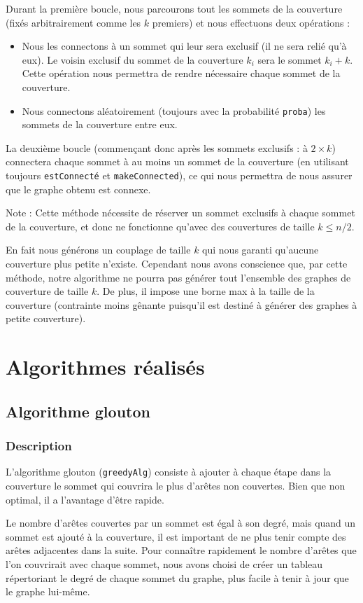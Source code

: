 \documentclass[a4paper,10pt]{article}
\newcommand*{\itemb}{\item[$\bullet$]}
\begin{document}
Durant la première boucle, nous parcourons tout les sommets de la couverture (fixés arbitrairement comme les $k$ premiers) et nous effectuons deux opérations :
\begin{itemize}
\itemb Nous les connectons à un sommet qui leur sera exclusif (il ne sera relié qu'à eux). Le voisin exclusif du sommet de la couverture $k_i$ sera le sommet $k_i+k$. Cette opération nous permettra de rendre nécessaire chaque sommet de la couverture.
\itemb Nous connectons aléatoirement (toujours avec la probabilité \texttt{proba}) les sommets de la couverture entre eux.
\end{itemize}
\bigskip
La deuxième boucle (commençant donc après les sommets exclusifs : à $2\times k$) connectera chaque sommet à au moins un sommet de la couverture (en utilisant toujours \texttt{estConnecté} et \texttt{makeConnected}), ce qui nous permettra de nous assurer que le graphe obtenu est connexe.
\bigskip

Note : Cette méthode nécessite de réserver un sommet exclusifs à chaque sommet de la couverture, et donc ne fonctionne qu'avec des couvertures de taille $k\leqslant n/2$.

En fait nous générons un couplage de taille $k$ qui nous garanti qu'aucune couverture plus petite n'existe. Cependant nous avons conscience que, par cette méthode, notre algorithme ne pourra pas générer tout l'ensemble des graphes de couverture de taille $k$. De plus, il impose une borne max à la taille de la couverture (contrainte moins gênante puisqu'il est destiné à générer des graphes à petite couverture).

\section{Algorithmes réalisés}

\subsection{Algorithme glouton}

\subsubsection{Description}

L'algorithme glouton (\texttt{greedyAlg}) consiste à ajouter à chaque étape dans la couverture le sommet qui couvrira le plus d'arêtes non couvertes. Bien que non optimal, il a l'avantage d'être rapide. 

Le nombre d'arêtes couvertes par un sommet est égal à son degré, mais quand un sommet est ajouté à la couverture, il est important de ne plus tenir compte des arêtes adjacentes dans la suite. Pour connaître rapidement le nombre d'arêtes que l'on couvrirait avec chaque sommet, nous avons choisi de créer un tableau répertoriant le degré de chaque sommet du graphe, plus facile à tenir à jour que le graphe lui-même. 
\end{document}
